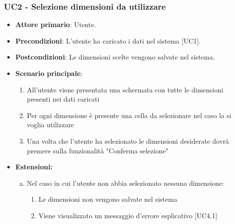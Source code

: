 \subsubsection{UC2 - Selezione dimensioni da utilizzare}
\begin{itemize}
	\item \textbf{Attore primario}: Utente.
	\item \textbf{Precondizioni}: L'utente ha caricato i dati nel sistema [UC1].
	\item \textbf{Postcondizioni}: Le dimensioni scelte vengono salvate nel sistema.
	\item \textbf{Scenario principale}:
		\begin{enumerate}
			\item All'utente viene presentata una schermata con tutte le dimensioni presenti nei dati caricati
			\item Per ogni dimensione è presente una cella da selezionare nel caso la si voglia utilizzare 
			\item Una volta che l'utente ha selezionato le dimensioni desiderate dovrà premere sulla funzionalità "Conferma selezione"
		\end{enumerate}
	\item \textbf{Estensioni:}
		\begin{enumerate}[(a)]
			\item Nel caso in cui l'utente non abbia selezionato nessuna dimensione:
			\begin{enumerate}[(1.)]
				\item Le dimensioni non vengono salvate nel sistema
				\item Viene visualizzato un messaggio d'errore esplicativo [UC4.1]
			\end{enumerate}
		\end{enumerate}
\end{itemize}